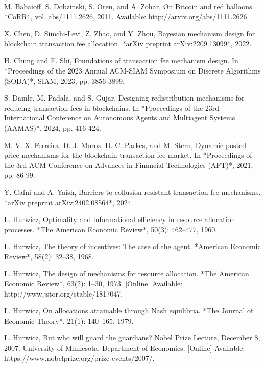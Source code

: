 \documentclass[11pt,a4paper]{llncs}
\begin{document}
\begin{thebibliography}{4}

M. Babaioff, S. Dobzinski, S. Oren, and A. Zohar, On Bitcoin and red balloons. *CoRR*, vol. abs/1111.2626, 2011. Available: http://arxiv.org/abs/1111.2626.

X. Chen, D. Simchi-Levi, Z. Zhao, and Y. Zhou, Bayesian mechanism design for blockchain transaction fee allocation. *arXiv preprint arXiv:2209.13099*, 2022.

H. Chung and E. Shi, Foundations of transaction fee mechanism design. In *Proceedings of the 2023 Annual ACM-SIAM Symposium on Discrete Algorithms (SODA)*, SIAM, 2023, pp. 3856-3899.

S. Damle, M. Padala, and S. Gujar, Designing redistribution mechanisms for reducing transaction fees in blockchains. In *Proceedings of the 23rd International Conference on Autonomous Agents and Multiagent Systems (AAMAS)*, 2024, pp. 416-424.

M. V. X. Ferreira, D. J. Moroz, D. C. Parkes, and M. Stern, Dynamic posted-price mechanisms for the blockchain transaction-fee market. In *Proceedings of the 3rd ACM Conference on Advances in Financial Technologies (AFT)*, 2021, pp. 86-99.

Y. Gafni and A. Yaish, Barriers to collusion-resistant transaction fee mechanisms. *arXiv preprint arXiv:2402.08564*, 2024.

L. Hurwicz, Optimality and informational efficiency in resource allocation processes. *The American Economic Review*, 50(3): 462--477, 1960.

L. Hurwicz, The theory of incentives: The case of the agent. *American Economic Review*, 58(2): 32--38, 1968.

L. Hurwicz, The design of mechanisms for resource allocation. *The American Economic Review*, 63(2): 1--30, 1973. [Online] Available: http://www.jstor.org/stable/1817047.

L. Hurwicz, On allocations attainable through Nash equilibria. *The Journal of Economic Theory*, 21(1): 140--165, 1979.

L. Hurwicz, But who will guard the guardians? Nobel Prize Lecture, December 8, 2007. University of Minnesota, Department of Economics. [Online] Available: https://www.nobelprize.org/prize-events/2007/.


\end{thebibliography}
\end{document}
